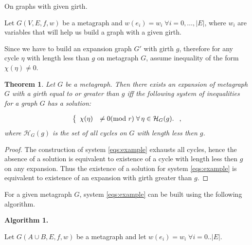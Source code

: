 \documentclass[leqno]{aadmbook}
\newtheorem{theorem}{Theorem}
\renewcommand{\mod}[1]{\textrm{mod}\ #1}
\begin{document}

\vspace{1.5cc}
\begin{section}
{On graphs with given girth.}

Let $G(V, E, f, w)$ be a metagraph and $w(e_i) = w_i \; \forall i = 0, \dots, |E|$, where $w_i$ are variables that will help us build a graph with a given girth.

Since we have to build an expansion graph $G'$ with girth $g$, therefore for any cycle $\eta$ with length less than $g$ on metagraph $G$, assume inequality of the form $\chi(\eta) \neq 0$.

\begin{theorem}

Let $G$ be a metagraph. Then there exists an expansion of metagraph $G$ with a girth equal to or greater than $g$ iff the following system of inequalities for a graph $G$ has a solution:

\begin{equation}
    \centering
    \left\{
        \begin{array}{ll}
            \chi(\eta) &\neq 0 (\mod{r}) \; \forall \, \eta \in \mathcal{H}_G(g).
        \end{array}
    \right.,
    \label{eqs:example}
\end{equation}
where $\mathcal{H}_G(g)$ is the set of all cycles on $G$ with length less then $g$.

\end{theorem}

\begin{proof}
    The construction of system \eqref{eqs:example} exhausts all cycles, hence the absence of a solution is equivalent to existence of a cycle with length less then $g$ on any expansion. Thus the existence of a solution for system \eqref{eqs:example} is equivalent to existence of an expansion with girth greater than $g$.
\end{proof}

For a given metagraph $G$, system \eqref{eqs:example} can be built using the following algorithm.

\textbf{Algorithm 1.}

Let $G(A \cup B, E, f, w)$ be a metagraph and let $w(e_i) = w_i \; \forall i = 0..|E|$.


\end{section}
\end{document}
